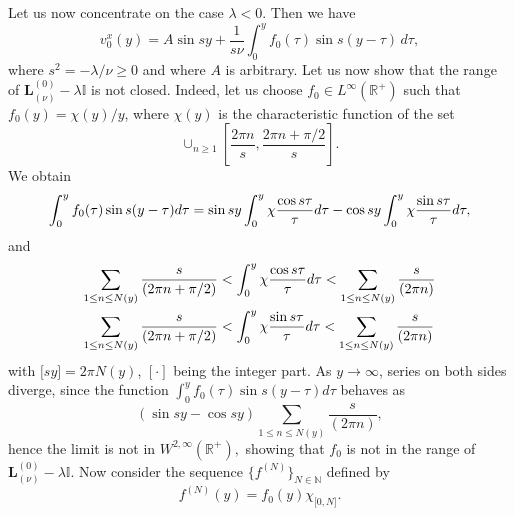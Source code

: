 \documentclass[11pt]{article}
\begin{document}
Let us now concentrate on the case $\lambda <0$. Then we have%
\begin{equation*}
v_{0}^{x}(y)=A\sin sy+\frac{1}{s\nu }\int_{0}^{y}f_{0}(\tau )\sin s(y-\tau) \, d\tau ,
\end{equation*}%
where $s^2 = - \lambda / \nu \ge 0$ and where
 $A$ is arbitrary. Let us now show that the range of $\boldsymbol{L}_{(\nu)}^{(0)}-\lambda \mathbb{I}$ is not closed.
Indeed, let us choose $f_{0}\in L^{\infty }(\mathbb{R}^{+})$ such that $f_{0}(y) = \chi(y)/y$, where 
$\chi(y)$ is the characteristic function of the set%
\begin{equation*}
\cup _{n\geq 1}[\frac{2\pi n}{s},\frac{2\pi n+\pi /2}{s}].
\end{equation*}%
We obtain%
\begin{equation*}
\int_{0}^{y}f_{0}(\tau )\sin s(y-\tau )d\tau =\sin sy\int_{0}^{y}\chi \frac{%
\cos s\tau }{\tau }d\tau -\cos sy\int_{0}^{y}\chi \frac{\sin s\tau }{\tau }%
d\tau ,
\end{equation*}%
and%
\begin{align*}
\sum_{1\leq n\leq N(y)}\frac{s}{(2\pi n+\pi /2)} &< \int_{0}^{y}\chi \frac{%
\cos s\tau }{\tau }d\tau <\sum_{1\leq n\leq N(y)}\frac{s}{(2\pi n)} \\
\sum_{1\leq n\leq N(y)}\frac{s}{(2\pi n+\pi /2)} &< \int_{0}^{y}\chi \frac{%
\sin s\tau }{\tau }d\tau <\sum_{1\leq n\leq N(y)}\frac{s}{(2\pi n)}
\end{align*}%
with 
$\lbrack sy]=2\pi N(y)$, $[\cdot ]$ being the integer part.
As $y\rightarrow \infty$, series on both sides diverge, since the function $%
\int_{0}^{y}f_{0}(\tau )\sin s(y-\tau )d\tau $ behaves as%
\begin{equation*}
(\sin sy-\cos sy)\sum_{1\leq n\leq N(y)}\frac{s}{(2\pi n)},
\end{equation*}%
hence the limit is not in $W^{2,\infty }(\mathbb{R}^{+}),$ showing that $f_{0}$ is not
in the range of $\boldsymbol{L}_{(\nu )}^{(0)}-\lambda \mathbb{I}.$ Now consider
the sequence $\{f^{(N)}\}_{N\in \mathbb{N}}$ defined by%
\begin{equation*}
f^{(N)}(y)=f_{0}(y)\chi _{\lbrack 0,N]}.
\end{equation*}%
\end{document}
